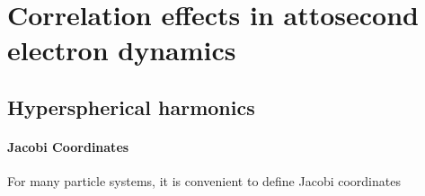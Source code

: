 \chapter{Correlation effects in attosecond electron dynamics} %
\label{cha:electron_correlation}

\section{Hyperspherical harmonics}
\label{sec:hyperspherical}

\subsubsection{Jacobi Coordinates} %
\label{ssub:jacobi_coordinates}
For many particle systems, it is convenient to define Jacobi coordinates

